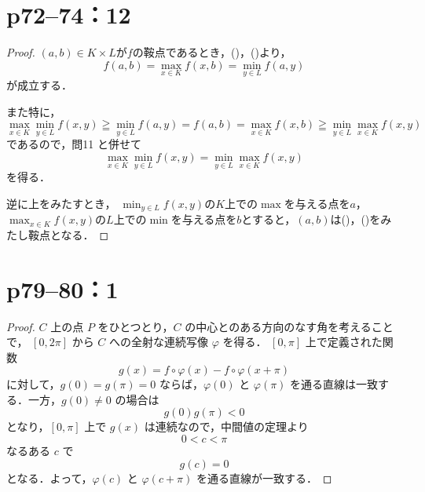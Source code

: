 \newpage


\section*{p72--74：12}

\begin{tleftbar}
    \begin{proof}
        $(a,b) \in K \times L$が$f$の鞍点であるとき，()，()より，
        \[
            f(a,b) = \max_{x \in K} f(x,b) = \min_{y \in L} f(a,y)
        \]
        が成立する．

        また特に，
        \[
            \max_{x \in K} \min_{y \in L} f(x,y) \geqq \min_{y \in L} f(a,y) =f(a,b)= \max_{x \in K} f(x,b) \geqq \min_{y \in L} \max_{x \in K} f(x,y)
        \]
        であるので，問11 と併せて
        \[
            \max_{x \in K} \min_{y \in L} f(x,y) = \min_{y \in L} \max_{x \in K} f(x,y)
        \]
        を得る．

        逆に上をみたすとき，
        $\min_{y \in L} f(x,y)$の$K$上での$\max$を与える点を$a$，
        $\max_{x \in K} f(x,y)$の$L$上での$\min$を与える点を$b$とすると，$(a,b)$は()，()をみたし鞍点となる．
    \end{proof}
\end{tleftbar}
\newpage


\section*{p79--80：1}

\begin{leftbar}
    \begin{proof}
        $C$ 上の点 $P$ をひとつとり，$C$ の中心とのある方向のなす角を考えることで，
        $[0,2\pi]$ から $C$ への全射な連続写像 $\varphi$ を得る．
        $[0,\pi]$ 上で定義された関数
        \[
            g(x) = f\circ \varphi(x) - f \circ \varphi(x+\pi)
        \]
        に対して，$g(0) = g(\pi) = 0$ ならば，$\varphi(0)$ と $\varphi(\pi)$ を通る直線は一致する．一方，$g(0) \ne 0$ の場合は
        \[
            g(0)g(\pi) < 0
        \]
        となり，$[0,\pi]$ 上で $g(x)$ は連続なので，中間値の定理より
        \[
            0 < c < \pi
        \]
        なるある $c$ で
        \[
            g(c) = 0
        \]
        となる．よって，$\varphi(c)$ と $\varphi(c+\pi)$ を通る直線が一致する．
    \end{proof}
\end{leftbar}


